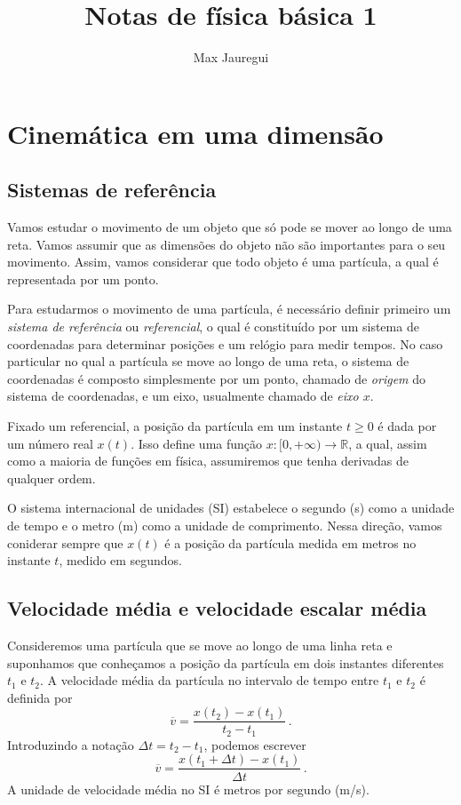 \documentclass[12pt,a4paper]{article}
\title{Notas de física básica 1}
\author{Max Jauregui}
\newcommand{\R}{\mathbb{R}}
\theoremstyle{definition}
\begin{document}
\maketitle
\section{Cinemática em uma dimensão}

\subsection{Sistemas de referência}

Vamos estudar o movimento de um objeto que só pode se mover ao longo
de uma reta. Vamos assumir que as dimensões do objeto não são
importantes para o seu movimento. Assim, vamos considerar que todo
objeto é uma partícula, a qual é representada por um ponto.

Para estudarmos o movimento de uma partícula, é necessário definir
primeiro um \emph{sistema de referência} ou \emph{referencial}, o qual
é constituído por um sistema de coordenadas para determinar posições e
um relógio para medir tempos. No caso particular no qual a partícula
se move ao longo de uma reta, o sistema de coordenadas é composto
simplesmente por um ponto, chamado de \emph{origem} do sistema de
coordenadas, e um eixo, usualmente chamado de \emph{eixo $x$}.

Fixado um referencial, a posição da partícula em um instante $t\ge 0$
é dada por um número real $x(t)$. Isso define uma função
$x:[0,+\infty)\to\R$, a qual, assim como a maioria de funções em
física, assumiremos que tenha derivadas de qualquer ordem.

O sistema internacional de unidades (SI) estabelece o segundo (s) como
a unidade de tempo e o metro (m) como a unidade de comprimento. Nessa
direção, vamos coniderar sempre que $x(t)$ é a posição da partícula
medida em metros no instante $t$, medido em segundos.

\subsection{Velocidade média e velocidade escalar média}

Consideremos uma partícula que se move ao longo de uma linha reta e
suponhamos que conheçamos a posição da partícula em dois instantes
diferentes $t_1$ e $t_2$. A velocidade média da partícula no intervalo
de tempo entre $t_1$ e $t_2$ é definida por
$$\overline v=\frac{x(t_2)-x(t_1)}{t_2-t_1}\,.$$
Introduzindo a notação $\Delta t=t_2-t_1$, podemos escrever
$$\overline{v}=\frac{x(t_1+\Delta t)-x(t_1)}{\Delta t}\,.$$
A unidade de velocidade média no SI é metros por segundo (m/s).
\end{document}
